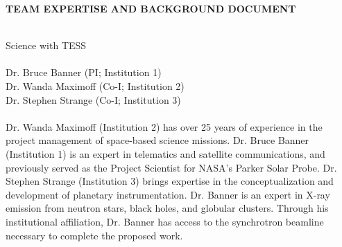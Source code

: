 \documentclass[letterpaper,12pt]{article}
\begin{document}
\pagestyle{plain}


\begin{center} 
\bfseries\uppercase{
Team Expertise and Background Document 
}
\end{center}







\\
Science with TESS\\


\\
Dr. Bruce Banner (PI; Institution 1) \\
Dr. Wanda Maximoff (Co-I; Institution 2) \\
Dr. Stephen Strange (Co-I; Institution 3) \\



\\
Dr. Wanda Maximoff (Institution 2) has over 25 years of experience in the project management of space-based science missions. Dr. Bruce Banner (Institution 1) is an expert in telematics and satellite communications, and previously served as the Project Scientist for NASA's Parker Solar Probe. Dr. Stephen Strange (Institution 3) brings expertise in the conceptualization and development of planetary instrumentation. Dr. Banner is an expert in X-ray emission from neutron stars, black holes, and globular clusters. Through his institutional affiliation, Dr. Banner has access to the synchrotron beamline necessary to complete the proposed work.
  
\end{document}
